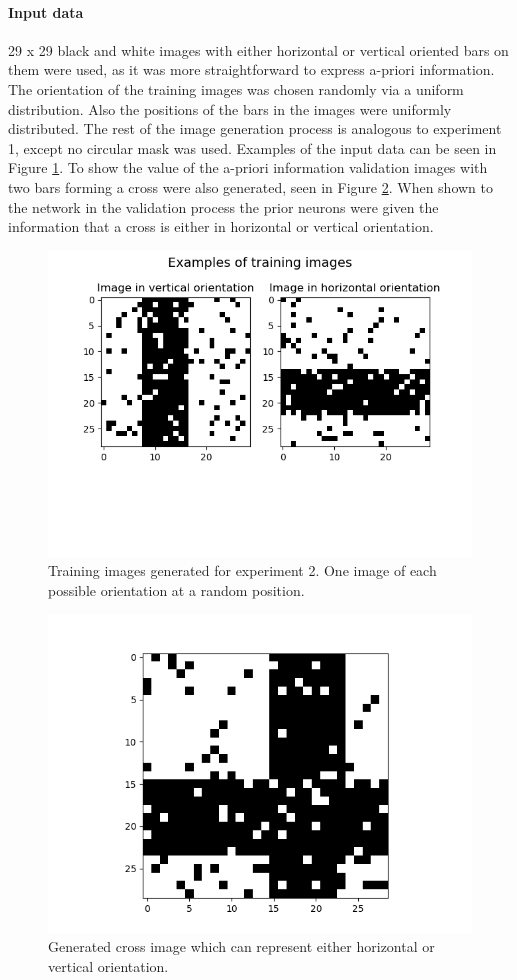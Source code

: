 \paragraph{Input data}
29 x 29 black and white images with either horizontal or vertical oriented bars on them were used, as it was more straightforward to express a-priori information. The orientation of the training images was chosen randomly via a uniform distribution. Also the positions of the bars in the images were uniformly distributed. The rest of the image generation process is analogous to experiment 1, except no circular mask was used. Examples of the input data can be seen in Figure \ref{fig:horvertImages}. To show the value of the a-priori information validation images with two bars forming a cross were also generated, seen in Figure \ref{fig:horvertTrainingCrossImage}. When shown to the network in the validation process the prior neurons were given the information that a cross is either in horizontal or vertical orientation.

\begin{figure}
  \includegraphics[width=\linewidth]{figures/horvert/horvertTrainingImages.png}
  \caption{Training images generated for experiment 2. One image of each possible orientation at a random position.}
  \label{fig:horvertImages}
\end{figure}

\begin{figure}
  \includegraphics[width=0.6\linewidth]{figures/horvert/horvertTrainingCrossImage.png}
  \caption{Generated cross image which can represent either horizontal or vertical orientation.}
  \label{fig:horvertTrainingCrossImage}
\end{figure}


